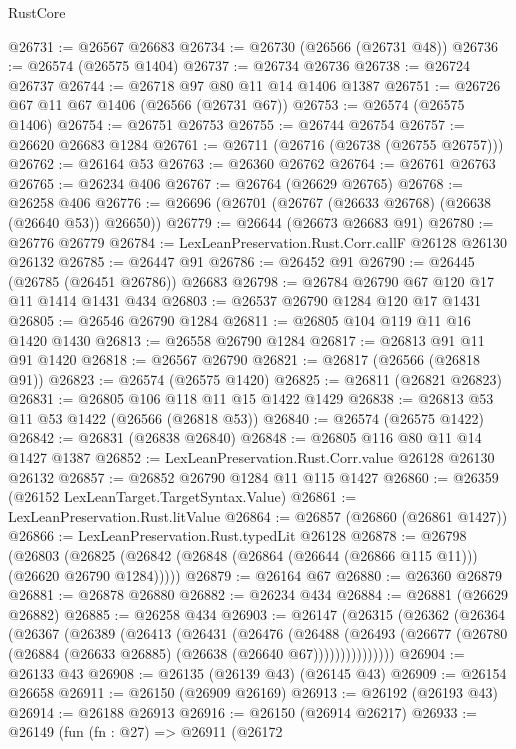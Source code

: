 \begin{lexlean}{RustCore}
\begin{coremodule}
@26731 := @26567 @26683
@26734 := @26730 (@26566 (@26731 @48))
@26736 := @26574 (@26575 @1404)
@26737 := @26734 @26736
@26738 := @26724 @26737
@26744 := @26718 @97 @80 @11 @14 @1406 @1387
@26751 := @26726 @67 @11 @67 @1406 (@26566 (@26731 @67))
@26753 := @26574 (@26575 @1406)
@26754 := @26751 @26753
@26755 := @26744 @26754
@26757 := @26620 @26683 @1284
@26761 := @26711 (@26716 (@26738 (@26755 @26757)))
@26762 := @26164 @53
@26763 := @26360 @26762
@26764 := @26761 @26763
@26765 := @26234 @406
@26767 := @26764 (@26629 @26765)
@26768 := @26258 @406
@26776 := @26696 (@26701 (@26767 (@26633 @26768) (@26638 (@26640 @53)) @26650))
@26779 := @26644 (@26673 @26683 @91)
@26780 := @26776 @26779
@26784 := LexLeanPreservation.Rust.Corr.callF @26128 @26130 @26132
@26785 := @26447 @91
@26786 := @26452 @91
@26790 := @26445 (@26785 (@26451 @26786)) @26683
@26798 := @26784 @26790 @67 @120 @17 @11 @1414 @1431 @434
@26803 := @26537 @26790 @1284 @120 @17 @1431
@26805 := @26546 @26790 @1284
@26811 := @26805 @104 @119 @11 @16 @1420 @1430
@26813 := @26558 @26790 @1284
@26817 := @26813 @91 @11 @91 @1420
@26818 := @26567 @26790
@26821 := @26817 (@26566 (@26818 @91))
@26823 := @26574 (@26575 @1420)
@26825 := @26811 (@26821 @26823)
@26831 := @26805 @106 @118 @11 @15 @1422 @1429
@26838 := @26813 @53 @11 @53 @1422 (@26566 (@26818 @53))
@26840 := @26574 (@26575 @1422)
@26842 := @26831 (@26838 @26840)
@26848 := @26805 @116 @80 @11 @14 @1427 @1387
@26852 := LexLeanPreservation.Rust.Corr.value @26128 @26130 @26132
@26857 := @26852 @26790 @1284 @11 @115 @1427
@26860 := @26359 (@26152 LexLeanTarget.TargetSyntax.Value)
@26861 := LexLeanPreservation.Rust.litValue
@26864 := @26857 (@26860 (@26861 @1427))
@26866 := LexLeanPreservation.Rust.typedLit @26128
@26878 := @26798
    (@26803 (@26825 (@26842 (@26848 (@26864 (@26644 (@26866 @115 @11))) (@26620 @26790 @1284)))))
@26879 := @26164 @67
@26880 := @26360 @26879
@26881 := @26878 @26880
@26882 := @26234 @434
@26884 := @26881 (@26629 @26882)
@26885 := @26258 @434
@26903 := @26147
    (@26315
      (@26362
        (@26364
          (@26367
            (@26389
              (@26413
                (@26431
                  (@26476
                    (@26488
                      (@26493
                        (@26677 (@26780 (@26884 (@26633 @26885) (@26638 (@26640 @67)))))))))))))))
@26904 := @26133 @43
@26908 := @26135 (@26139 @43) (@26145 @43)
@26909 := @26154 @26658
@26911 := @26150 (@26909 @26169)
@26913 := @26192 (@26193 @43)
@26914 := @26188 @26913
@26916 := @26150 (@26914 @26217)
@26933 := @26149
    (fun (fn : @27) =>
    @26911
      (@26172

\end{coremodule}
\end{lexlean}

